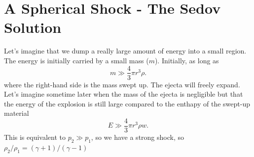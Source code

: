 \section{A Spherical Shock - The Sedov Solution}
\label{sec:spher-shock-sedov}

Let's imagine that we dump a really large amount of energy into a
small region.  The energy is initially carried by a small mass ($m$).
Initially, as long as 
\begin{equation}
m \gg \frac{4}{3} \pi r^3 \rho.
\label{eq:708}
\end{equation}
where the right-hand side is the mass swept up.
The ejecta will freely expand.  Let's imagine sometime later when the
mass of the ejecta is negligible but that the energy of the explosion
is still large compared to the enthapy of the swept-up material
\begin{equation}
E \gg \frac{4}{3} \pi r^3 \rho w.
\label{eq:709}
\end{equation}
This is equivalent to $p_2 \gg p_1$, so we have a strong shock, so
$\rho_2/\rho_1 = (\gamma+1)/(\gamma-1)$

